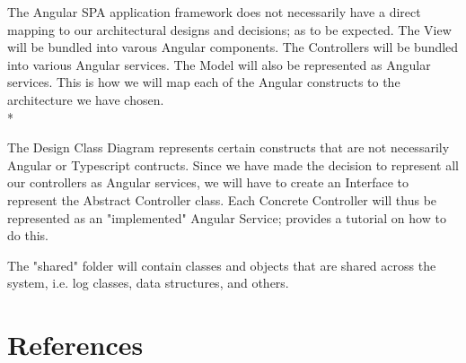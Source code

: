 \documentclass[11pt]{article}
\begin{document}

The Angular SPA application framework does not necessarily have a direct mapping to our architectural designs and decisions; as to be expected. The View will be bundled into varous Angular components. The Controllers will be bundled into various Angular services. The Model will also be represented as Angular services. This is how we will map each of the Angular constructs to the architecture we have chosen.\\*

The Design Class Diagram represents certain constructs that are not necessarily Angular or Typescript contructs. Since we have made the decision to represent all our controllers as Angular services, we will have to create an Interface to represent the Abstract Controller class. Each Concrete Controller will thus be represented as an "implemented" Angular Service; \cite{Website:5} provides a tutorial on how to do this.

The "shared" folder will contain classes and objects  that are shared across the system, i.e. log classes, data structures, and others.

\section{References}


\end{document}
